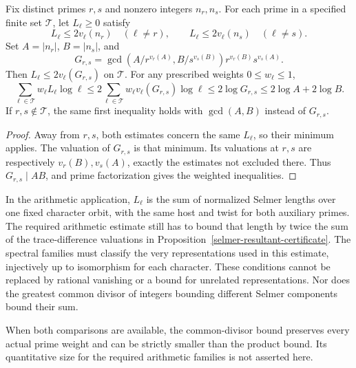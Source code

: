 \begin{proposition}
\label{selmer-corrected-gcd}
Fix distinct primes \(r,s\) and nonzero integers \(n_r,n_s\).
For each prime in a specified finite set \(\mathcal T\), let
\(L_\ell\ge0\) satisfy
\[
 L_\ell\le2v_\ell(n_r)\quad(\ell\ne r),\qquad
 L_\ell\le2v_\ell(n_s)\quad(\ell\ne s).
\]
Set \(A=|n_r|\), \(B=|n_s|\), and
\[
 G_{r,s}=
 \gcd\!\left(A/r^{v_r(A)},B/s^{v_s(B)}\right)
             r^{v_r(B)}s^{v_s(A)}.
\]
Then \(L_\ell\le2v_\ell(G_{r,s})\) on \(\mathcal T\).
For any prescribed weights \(0\le w_\ell\le1\),
\[
 \sum_{\ell\in\mathcal T}w_\ell L_\ell\log\ell
 \le2\sum_{\ell\in\mathcal T}w_\ell
                      v_\ell(G_{r,s})\log\ell
 \le2\log G_{r,s}\le2\log A+2\log B.
\]
If \(r,s\notin\mathcal T\), the same first inequality holds
with \(\gcd(A,B)\) instead of \(G_{r,s}\).
\end{proposition}

\begin{proof}
Away from \(r,s\), both estimates concern the same \(L_\ell\),
so their minimum applies. The valuation of \(G_{r,s}\) is that
minimum. Its valuations at \(r,s\) are respectively
\(v_r(B),v_s(A)\), exactly the estimates not excluded there.
Thus \(G_{r,s}\mid AB\), and prime factorization gives the weighted
inequalities.
\end{proof}

In the arithmetic application, \(L_\ell\) is the sum of normalized
Selmer lengths over one fixed character orbit, with the same host and
twist for both auxiliary primes. The required arithmetic estimate still
has to bound that length by twice the sum of the trace-difference
valuations in Proposition~\ref{selmer-resultant-certificate}.
The spectral families must classify the very representations used in
this estimate, injectively up to isomorphism for each character.
These conditions cannot be replaced by rational vanishing or a bound
for unrelated representations. Nor does the greatest common divisor of
integers bounding different Selmer components bound their sum.

When both comparisons are available, the common-divisor bound preserves
every actual prime weight and can be strictly smaller than the product
bound. Its quantitative size for the required arithmetic families is
not asserted here.
